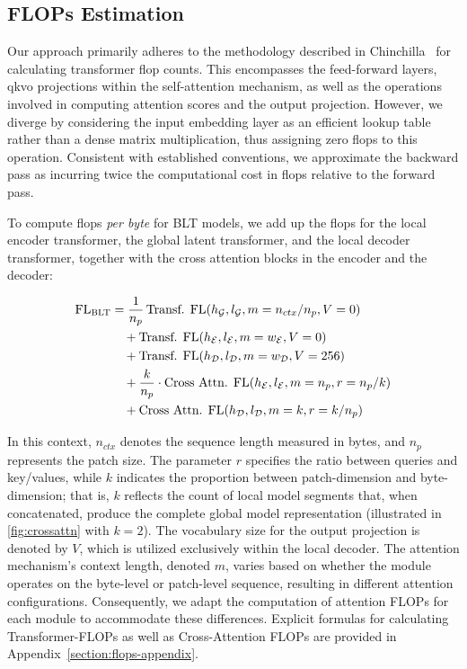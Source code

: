 \subsection{FLOPs Estimation} 
\label{section:flops}

Our approach primarily adheres to the methodology described in Chinchilla~\citep{hoffmann2022training} for calculating transformer flop counts. This encompasses the feed-forward layers, qkvo projections within the self-attention mechanism, as well as the operations involved in computing attention scores and the output projection. However, we diverge by considering the input embedding layer as an efficient lookup table rather than a dense matrix multiplication, thus assigning zero flops to this operation. Consistent with established conventions, we approximate the backward pass as incurring twice the computational cost in flops relative to the forward pass.

To compute flops \textit{per byte} for {\textsc BLT} models, we add up the flops for the local encoder transformer, the global latent transformer, and the local decoder transformer, together with the cross attention blocks in the encoder and the decoder:

\begin{align}
    \text{FL}_{\text{{\textsc BLT}}} &= \frac{1}{n_p}\, \text{Transf. FL}(h_{\mathcal{G}}, l_{\mathcal{G}}, m=n_{ctx}/n_p, V=0)\\
    &\quad + \text{Transf. FL}(h_{\mathcal{E}}, l_{\mathcal{E}}, m=w_{\mathcal{E}}, V=0) \\
    &\quad + \text{Transf. FL}(h_{\mathcal{D}}, l_{\mathcal{D}}, m=w_{\mathcal{D}}, V=256) \\ 
    &\quad + \frac{k}{n_p} \cdot \text{Cross Attn. FL}(h_{\mathcal{E}}, l_{\mathcal{E}}, m=n_p, r=n_p/k) \\ 
    &\quad + \text{Cross Attn. FL}(h_{\mathcal{D}}, l_{\mathcal{D}}, m=k, r=k/n_p) 
\end{align}

In this context, $n_{ctx}$ denotes the sequence length measured in bytes, and $n_p$ represents the patch size. The parameter $r$ specifies the ratio between queries and key/values, while $k$ indicates the proportion between patch-dimension and byte-dimension; that is, $k$ reflects the count of local model segments that, when concatenated, produce the complete global model representation (illustrated in \autoref{fig:crossattn} with $k=2$). The vocabulary size for the output projection is denoted by $V$, which is utilized exclusively within the local decoder. The attention mechanism’s context length, denoted $m$, varies based on whether the module operates on the byte-level or patch-level sequence, resulting in different attention configurations. Consequently, we adapt the computation of attention FLOPs for each module to accommodate these differences. Explicit formulas for calculating Transformer-FLOPs as well as Cross-Attention FLOPs are provided in Appendix~\ref{section:flops-appendix}.

